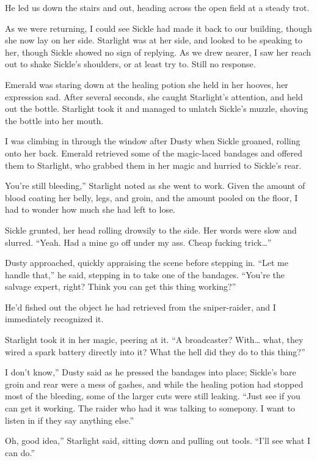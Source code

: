 He led us down the stairs and out, heading across the open field at a steady trot.

As we were returning, I could see Sickle had made it back to our building, though she now lay on her side. Starlight was at her side, and looked to be speaking to her, though Sickle showed no sign of replying. As we drew nearer, I saw her reach out to shake Sickle’s shoulders, or at least try to. Still no response.

Emerald was staring down at the healing potion she held in her hooves, her expression sad. After several seconds, she caught Starlight’s attention, and held out the bottle. Starlight took it and managed to unlatch Sickle’s muzzle, shoving the bottle into her mouth.

I was climbing in through the window after Dusty when Sickle groaned, rolling onto her back. Emerald retrieved some of the magic-laced bandages and offered them to Starlight, who grabbed them in her magic and hurried to Sickle’s rear.

\leavevmode{}You’re still bleeding,” Starlight noted as she went to work. Given the amount of blood coating her belly, legs, and groin, and the amount pooled on the floor, I had to wonder how much she had left to lose.

Sickle grunted, her head rolling drowsily to the side. Her words were slow and slurred. “Yeah. Had a mine go off under my ass. Cheap fucking trick…”

Dusty approached, quickly appraising the scene before stepping in. “Let me handle that,” he said, stepping in to take one of the bandages. “You’re the salvage expert, right? Think you can get this thing working?”

He’d fished out the object he had retrieved from the sniper-raider, and I immediately recognized it.

Starlight took it in her magic, peering at it. “A broadcaster? With… what, they wired a spark battery directly into it? What the hell did they do to this thing?”

\leavevmode{}I don’t know,” Dusty said as he pressed the bandages into place; Sickle’s bare groin and rear were a mess of gashes, and while the healing potion had stopped most of the bleeding, some of the larger cuts were still leaking. “Just see if you can get it working. The raider who had it was talking to somepony. I want to listen in if they say anything else.”

\leavevmode{}Oh, good idea,” Starlight said, sitting down and pulling out tools. “I’ll see what I can do.”

